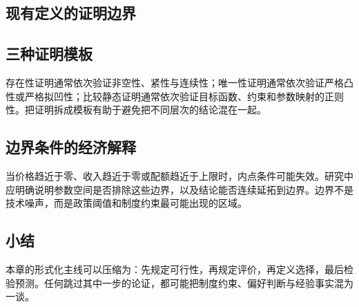 \subsection{现有定义的证明边界}
\subsection{三种证明模板}
存在性证明通常依次验证非空性、紧性与连续性；唯一性证明通常依次验证严格凸性或严格拟凹性；比较静态证明通常依次验证目标函数、约束和参数映射的正则性。把证明拆成模板有助于避免把不同层次的结论混在一起。

\subsection{边界条件的经济解释}
当价格趋近于零、收入趋近于零或配额趋近于上限时，内点条件可能失效。研究中应明确说明参数空间是否排除这些边界，以及结论能否连续延拓到边界。边界不是技术噪声，而是政策阈值和制度约束最可能出现的区域。

\subsection{小结}
本章的形式化主线可以压缩为：先规定可行性，再规定评价，再定义选择，最后检验预测。任何跳过其中一步的论证，都可能把制度约束、偏好判断与经验事实混为一谈。

